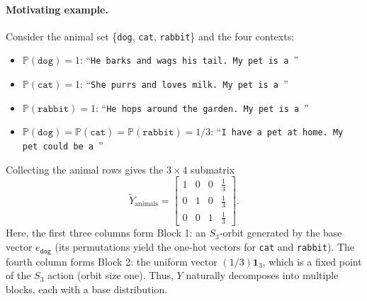 \documentclass[11pt]{article}
\begin{document}
\paragraph{Motivating example.}
Consider the animal set \{\texttt{dog}, \texttt{cat}, \texttt{rabbit}\} and the four contexts:
\begin{itemize}
  \item \(\mathbb{P}(\texttt{dog})=1\): ``\texttt{He barks and wags his tail. My pet is a \textvisiblespace}''
  \item \(\mathbb{P}(\texttt{cat})=1\): ``\texttt{She purrs and loves milk. My pet is a \textvisiblespace}''
  \item \(\mathbb{P}(\texttt{rabbit})=1\): ``\texttt{He hops around the garden. My pet is a \textvisiblespace}''
  \item \(\mathbb{P}(\texttt{dog})=\mathbb{P}(\texttt{cat})=\mathbb{P}(\texttt{rabbit})=1/3\): ``\texttt{I have a pet at home. My pet could be a \textvisiblespace}''
\end{itemize}
Collecting the animal rows gives the \(3\times4\) submatrix
\[
\widetilde{Y}_{\mathrm{animals}}
=\begin{bmatrix}
1   & 0   & 0   & \frac{1}{3} \\[4pt]
0   & 1   & 0   & \frac{1}{3} \\[4pt]
0   & 0   & 1   & \frac{1}{3}
\end{bmatrix}.
\]
Here, the first three columns form Block 1: an \(S_3\)-orbit generated by the base vector \(e_{\texttt{dog}}\) (its permutations yield the one-hot vectors for \texttt{cat} and \texttt{rabbit}). The fourth column forms Block 2: the uniform vector \((1/3)\boldsymbol{1}_3\), which is a fixed point of the \(S_3\) action (orbit size one). Thus, \(Y\) naturally decomposes into multiple blocks, each with a base distribution. 
\end{document}
